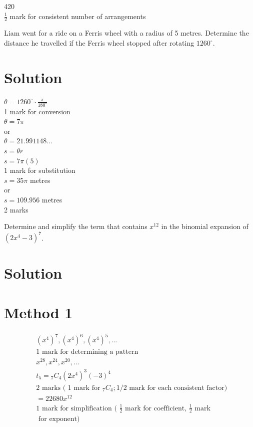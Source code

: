 \documentclass[10pt]{article}
\begin{document}
420\\
$\frac{1}{2}$ mark for consistent number of arrangements

Liam went for a ride on a Ferris wheel with a radius of 5 metres. Determine the distance he travelled if the Ferris wheel stopped after rotating $1260^{\circ}$.

\section*{Solution}
$\theta=1260^{\circ} \cdot \frac{\pi}{180^{\circ}}$\\
1 mark for conversion\\
$\theta=7 \pi$\\
or\\
$\theta=21.991148 \ldots$\\
$s=\theta r$\\
$s=7 \pi(5)$\\
1 mark for substitution\\
$s=35 \pi$ metres\\
or\\
$s=109.956$ metres\\
2 marks

Determine and simplify the term that contains $x^{12}$ in the binomial expansion of $\left(2 x^{4}-3\right)^{7}$.

\section*{Solution}
\section*{Method 1}
$$
\begin{aligned}
& \left(x^{4}\right)^{7},\left(x^{4}\right)^{6},\left(x^{4}\right)^{5}, \ldots \\
& 1 \text { mark for determining a pattern } \\
& x^{28}, x^{24}, x^{20}, \ldots \\
& t_{5}={ }_{7} C_{4}\left(2 x^{4}\right)^{3}(-3)^{4} \\
& 2 \text { marks ( } 1 \text { mark for }{ }_{7} C_{4} ; 1 / 2 \text { mark for each consistent factor) } \\
& =22680 x^{12} \\
& 1 \text { mark for simplification ( } \frac{1}{2} \text { mark for coefficient, } \frac{1}{2} \text { mark } \\
& \text { for exponent) }
\end{aligned}
$$
\end{document}
